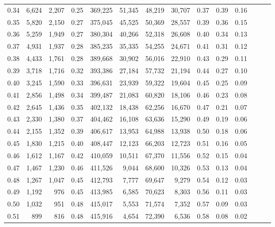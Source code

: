 \begin{tabular}{rrrrrrrrrrrrrr}
0.34 &   6,624 &  2,207 &  0.25 &  369,225 &   51,345 &  48,219 &  30,707 &  0.37 &  0.39 &      0.16 \\
0.35 &   5,820 &  2,150 &  0.27 &  375,045 &   45,525 &  50,369 &  28,557 &  0.39 &  0.36 &      0.15 \\
0.36 &   5,259 &  1,949 &  0.27 &  380,304 &   40,266 &  52,318 &  26,608 &  0.40 &  0.34 &      0.13 \\
0.37 &   4,931 &  1,937 &  0.28 &  385,235 &   35,335 &  54,255 &  24,671 &  0.41 &  0.31 &      0.12 \\
0.38 &   4,433 &  1,761 &  0.28 &  389,668 &   30,902 &  56,016 &  22,910 &  0.43 &  0.29 &      0.11 \\
0.39 &   3,718 &  1,716 &  0.32 &  393,386 &   27,184 &  57,732 &  21,194 &  0.44 &  0.27 &      0.10 \\
0.40 &   3,245 &  1,590 &  0.33 &  396,631 &   23,939 &  59,322 &  19,604 &  0.45 &  0.25 &      0.09 \\
0.41 &   2,856 &  1,498 &  0.34 &  399,487 &   21,083 &  60,820 &  18,106 &  0.46 &  0.23 &      0.08 \\
0.42 &   2,645 &  1,436 &  0.35 &  402,132 &   18,438 &  62,256 &  16,670 &  0.47 &  0.21 &      0.07 \\
0.43 &   2,330 &  1,380 &  0.37 &  404,462 &   16,108 &  63,636 &  15,290 &  0.49 &  0.19 &      0.06 \\
0.44 &   2,155 &  1,352 &  0.39 &  406,617 &   13,953 &  64,988 &  13,938 &  0.50 &  0.18 &      0.06 \\
0.45 &   1,830 &  1,215 &  0.40 &  408,447 &   12,123 &  66,203 &  12,723 &  0.51 &  0.16 &      0.05 \\
0.46 &   1,612 &  1,167 &  0.42 &  410,059 &   10,511 &  67,370 &  11,556 &  0.52 &  0.15 &      0.04 \\
0.47 &   1,467 &  1,230 &  0.46 &  411,526 &    9,044 &  68,600 &  10,326 &  0.53 &  0.13 &      0.04 \\
0.48 &   1,267 &  1,047 &  0.45 &  412,793 &    7,777 &  69,647 &   9,279 &  0.54 &  0.12 &      0.03 \\
0.49 &   1,192 &    976 &  0.45 &  413,985 &    6,585 &  70,623 &   8,303 &  0.56 &  0.11 &      0.03 \\
0.50 &   1,032 &    951 &  0.48 &  415,017 &    5,553 &  71,574 &   7,352 &  0.57 &  0.09 &      0.03 \\
0.51 &     899 &    816 &  0.48 &  415,916 &    4,654 &  72,390 &   6,536 &  0.58 &  0.08 &      0.02 \\

\end{tabular}
